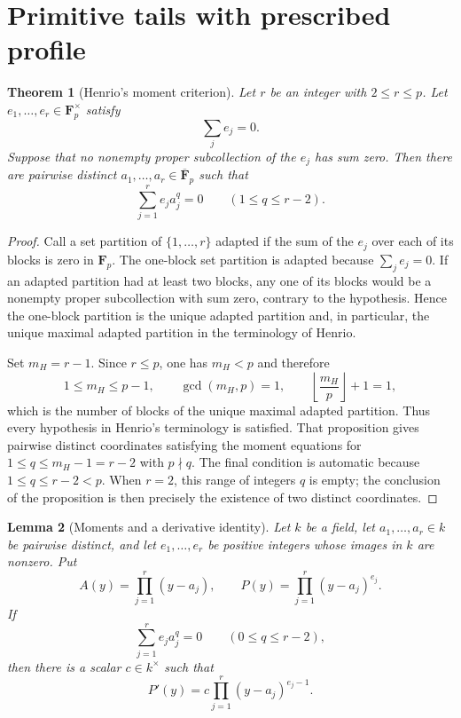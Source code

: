 \documentclass[11pt]{amsart}
\theoremstyle{plain}
\newtheorem{theorem}{Theorem}[section]
\newtheorem{lemma}[theorem]{Lemma}
\theoremstyle{definition}
\numberwithin{equation}{section}
\begin{document}
\section{Primitive tails with prescribed profile}

\begin{theorem}[Henrio's moment criterion]\label{thm:henrio-moments}
Let $r$ be an integer with $2\leq r\leq p$.  Let
$e_1,\ldots,e_r\in\mathbf F_p^\times$ satisfy
\[
 \sum_j e_j=0.
\]
Suppose that no nonempty proper subcollection of the
$e_j$ has sum zero.  Then there are pairwise distinct
$a_1,\ldots,a_r\in\overline{\mathbf F}_p$ such that
\begin{equation}\label{eq:henrio-moments}
 \sum_{j=1}^{r}e_j a_j^q=0\qquad(1\leq q\leq r-2).
\end{equation}
\end{theorem}

\begin{proof}
Call a set partition of $\{1,\ldots,r\}$ adapted if the sum of the $e_j$
over each of its blocks is zero in $\mathbf F_p$.  The one-block set
partition is adapted because $\sum_j e_j=0$.  If an adapted partition had
at least two blocks, any one of its blocks would be a nonempty proper
subcollection with sum zero, contrary to the hypothesis.  Hence the
one-block partition is the unique adapted partition and, in particular, the
unique maximal adapted partition in the terminology of Henrio.

Set $m_H=r-1$.  Since $r\leq p$, one has $m_H<p$ and therefore
\[
 1\leq m_H\leq p-1,\qquad \gcd(m_H,p)=1,\qquad
 \left\lfloor\frac{m_H}{p}\right\rfloor+1=1,
\]
which is the number of blocks of the unique maximal adapted partition.
Thus every hypothesis in Henrio's terminology
\cite[Definition~3.14 and Proposition~3.16(b)]{Henrio} is satisfied.
That proposition gives pairwise distinct coordinates satisfying the moment
equations for $1\leq q\leq m_H-1=r-2$ with $p\nmid q$.  The final condition
is automatic because $1\leq q\leq r-2<p$.  When $r=2$, this range of
integers $q$ is empty; the conclusion of the proposition is then precisely
the existence of two distinct coordinates.
\end{proof}

\begin{lemma}[Moments and a derivative identity]
\label{lem:moments-derivative}
Let $k$ be a field, let $a_1,\ldots,a_r\in k$ be pairwise distinct, and let
$e_1,\ldots,e_r$ be positive integers whose images in $k$ are nonzero.  Put
\[
 A(y)=\prod_{j=1}^r(y-a_j),\qquad
 P(y)=\prod_{j=1}^r(y-a_j)^{e_j}.
\]
If
\[
 \sum_{j=1}^r e_ja_j^q=0\qquad(0\leq q\leq r-2),
\]
then there is a scalar $c\in k^\times$ such that
\[
 P'(y)=c\prod_{j=1}^r(y-a_j)^{e_j-1}.
\]
\end{lemma}
\end{document}
